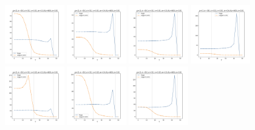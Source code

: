 \documentclass[a4paper]{article}
\begin{document}
\begin{figure}[H]
  \centering
  \includegraphics[width=0.23\textwidth]{grid-g6-v1-w1_0}
  \includegraphics[width=0.23\textwidth]{grid-g6-v1-w2_0}
  \includegraphics[width=0.23\textwidth]{grid-g6-v1-w3_0}
  \includegraphics[width=0.23\textwidth]{grid-g6-v1-w4_0}
  \\
  \includegraphics[width=0.23\textwidth]{grid-g6-v2-w1_0}
  \includegraphics[width=0.23\textwidth]{grid-g6-v2-w2_0}
  \includegraphics[width=0.23\textwidth]{grid-g6-v2-w3_0}

\end{figure}
\end{document}
